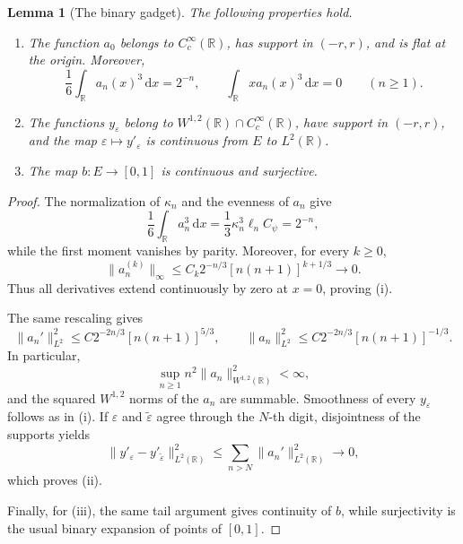 \documentclass[11pt]{amsart}
\newtheorem{lemma}[theorem]{Lemma}
\numberwithin{equation}{section}
\theoremstyle{remark}
\newcommand{\R}{\mathbb R}
\newcommand{\dd}{\,\mathrm d}
\begin{document}
\begin{lemma}[The binary gadget]\label{lem:binary}
The following properties hold.
\begin{enumerate}
 \item The function $a_0$ belongs to $C_c^\infty(\R)$, has support in
 $(-r,r)$, and is flat at the origin.  Moreover,
 \begin{equation}\label{eq:digit-moments}
  \frac16\int_\R a_n(x)^3\dd x=2^{-n},
  \qquad
  \int_\R xa_n(x)^3\dd x=0
  \qquad(n\geq1).
 \end{equation}
 \item The functions $y_\varepsilon$ belong to
 $W^{1,2}(\R)\cap C_c^\infty(\R)$, have support in $(-r,r)$, and
 the map $\varepsilon\mapsto y'_\varepsilon$ is continuous from $E$ to
 $L^2(\R)$.
 \item The map $b:E\to[0,1]$ is continuous and surjective.
\end{enumerate}
\end{lemma}

\begin{proof}
The normalization of $\kappa_n$ and the evenness of $a_n$ give
\begin{equation}
 \frac16\int_\R a_n^3\dd x
 =\frac13\kappa_n^3\ell_nC_\psi=2^{-n},
\end{equation}
while the first moment vanishes by parity.  Moreover, for every $k\geq0$,
\begin{equation}
 \|a_n^{(k)}\|_\infty
 \leq C_k2^{-n/3}[n(n+1)]^{k+1/3}\longrightarrow0.
\end{equation}
Thus all derivatives extend continuously by zero at  $x=0$, proving \textup{(i)}.

The same rescaling gives
\begin{equation}
 \|a_n'\|_{L^2}^2
 \leq C2^{-2n/3}[n(n+1)]^{5/3},
 \qquad
 \|a_n\|_{L^2}^2
 \leq C2^{-2n/3}[n(n+1)]^{-1/3}.
\end{equation}
In particular,
\begin{equation}\label{eq:w12-estimate}
 \sup_{n\geq1}n^2\|a_n\|_{W^{1,2}(\R)}^2<\infty,
\end{equation}
and the squared $W^{1,2}$ norms of the $a_n$ are summable.  Smoothness
of every $y_\varepsilon$ follows as in \textup{(i)}.  If $\varepsilon$
and $\tilde\varepsilon$ agree through the $N$-th digit, disjointness of
the supports yields
\begin{equation}
 \|y'_\varepsilon-y'_{\tilde\varepsilon}\|_{L^2(\R)}^2
 \leq\sum_{n>N}\|a_n'\|_{L^2(\R)}^2\longrightarrow0,
\end{equation}
which proves \textup{(ii)}.

Finally, for \textup{(iii)}, the same tail argument gives continuity
of $b$, while surjectivity is the usual binary expansion of points of
$[0,1]$.
\end{proof}
\end{document}
